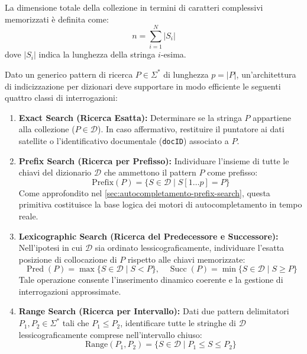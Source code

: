 La dimensione totale della collezione in termini di caratteri complessivi memorizzati \`e definita come:
\begin{equation}
  n = \sum_{i=1}^N |S_i|
\end{equation}
dove $|S_i|$ indica la lunghezza della stringa $i$-esima. 

Dato un generico pattern di ricerca $P \in \Sigma^*$ di lunghezza $p = |P|$, un'architettura di indicizzazione per dizionari deve supportare in modo efficiente le seguenti quattro classi di interrogazioni:

\begin{enumerate}
  \item \textbf{Exact Search (Ricerca Esatta):} Determinare se la stringa $P$ appartiene alla collezione ($P \in \mathcal{D}$). In caso affermativo, restituire il puntatore ai dati satellite o l'identificativo documentale (\texttt{docID}) associato a $P$.
  \item \textbf{Prefix Search (Ricerca per Prefisso):} Individuare l'insieme di tutte le chiavi del dizionario $\mathcal{D}$ che ammettono il pattern $P$ come prefisso:
  \begin{equation}
    \text{Prefix}(P) = \{ S \in \mathcal{D} \mid S[1 \dots p] = P \}
  \end{equation}
  Come approfondito nel \autoref{sec:autocompletamento-prefix-search}, questa primitiva costituisce la base logica dei motori di autocompletamento in tempo reale.
  \item \textbf{Lexicographic Search (Ricerca del Predecessore e Successore):} Nell'ipotesi in cui $\mathcal{D}$ sia ordinato lessicograficamente, individuare l'esatta posizione di collocazione di $P$ rispetto alle chiavi memorizzate:
  \begin{equation}
    \operatorname{Pred}(P) = \max \{ S \in \mathcal{D} \mid S < P \}, \quad \operatorname{Succ}(P) = \min \{ S \in \mathcal{D} \mid S \ge P \}
  \end{equation}
  Tale operazione consente l'inserimento dinamico coerente e la gestione di interrogazioni approssimate.
  \item \textbf{Range Search (Ricerca per Intervallo):} Dati due pattern delimitatori $P_1, P_2 \in \Sigma^*$ tali che $P_1 \le P_2$, identificare tutte le stringhe di $\mathcal{D}$ lessicograficamente comprese nell'intervallo chiuso:
  \begin{equation}
    \text{Range}(P_1, P_2) = \{ S \in \mathcal{D} \mid P_1 \le S \le P_2 \}
  \end{equation}
\end{enumerate}


